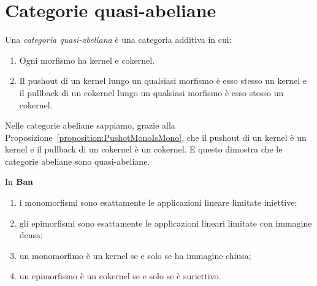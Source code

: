 \section{Categorie quasi-abeliane}

\begin{definition}
  Una {\em categoria quasi-abeliana} è una categoria additiva in cui:
  \begin{enumerate}[leftmargin=*]
  \item Ogni morfismo ha kernel e cokernel.
  \item Il pushout di un kernel lungo un qualsiasi morfismo è esso
    stesso un kernel e il pullback di un cokernel lungo un qualsiasi
    morfismo è esso stesso un cokernel.
  \end{enumerate}
\end{definition}

Nelle categorie abeliane sappiamo, grazie alla
Proposizione~\ref{proposition:PushotMonoIsMono}, che il pushout di un
kernel è un kernel e il pullback di un cokernel è un cokernel. E questo
dimostra che le categorie abeliane sono quasi-abeliane.

\begin{remark}
  In \(\mathbf{Ban}\)
  \begin{enumerate}
  \item i monomorfismi sono esattamente le applicazioni lineare limitate
    iniettive;
  \item gli epimorfismi sono esattamente le applicazioni lineari
    limitate con immagine densa;
  \item un monomorfimo è un kernel se e solo se ha immagine chiusa;
  \item un epimorfismo è un cokernel se e solo se è suriettivo.
  \end{enumerate}
\end{remark}

